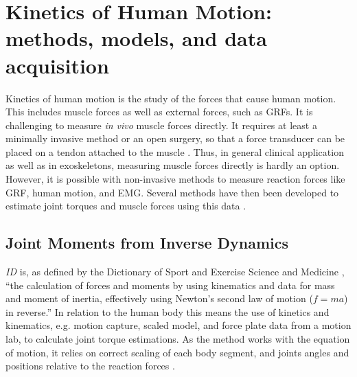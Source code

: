 \documentclass[../main.tex]{subfiles}
\begin{document}
\section{Kinetics of Human Motion: methods, models, and data acquisition}
\label{sec:A-MSModels}
Kinetics of human motion is the study of the forces that cause human motion. 
This includes muscle forces as well as external forces, such as \acp{GRF}.
It is challenging to measure \textit{in vivo} muscle forces directly.
It requires at least a minimally invasive method or an open surgery, so that a force transducer can be placed on a tendon attached to the muscle \cite{Erdemir2007}. 
Thus, in general clinical application as well as in exoskeletons, measuring muscle forces directly is hardly an option.
However, it is possible with non-invasive methods to measure reaction forces like \ac{GRF}, human motion, and \ac{EMG}.
Several methods have then been developed to estimate joint torques and muscle forces using this data \cite{Erdemir2007}.

\subsection{Joint Moments from Inverse Dynamics}
\label{sec:A-Inverse-Dynamics}
\textit{\Acf{ID}} is, as defined by the Dictionary of Sport and Exercise Science and Medicine \cite{inversedynamics}, ``the calculation of forces and moments by using kinematics and data for mass and moment of inertia, effectively using Newton's second law of motion ($f = ma$) in reverse.''
In relation to the human body this means the use of kinetics and kinematics, e.g. motion capture, scaled model, and force plate data from a motion lab, to calculate joint torque estimations.
As the method works with the equation of motion, it relies on correct scaling of each body segment, and joints angles and positions relative to the reaction forces \cite{Erdemir2007, Buchanan2004}.
\end{document}
